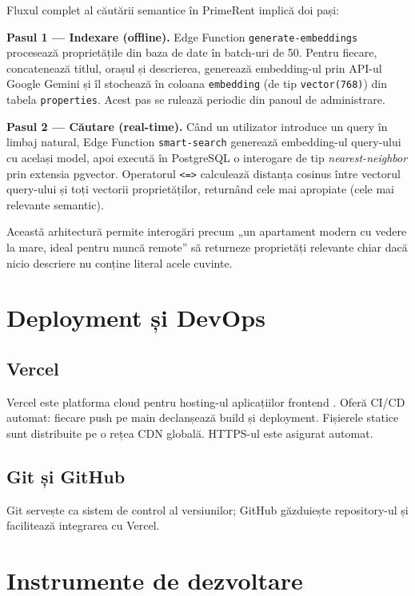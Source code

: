 \documentclass[12pt,a4paper,oneside]{report}
\begin{document}
Fluxul complet al căutării semantice în PrimeRent implică doi pași:

\textbf{Pasul 1 — Indexare (offline).} Edge Function \texttt{generate-embeddings} procesează proprietățile din baza de date în batch-uri de 50. Pentru fiecare, concatenează titlul, orașul și descrierea, generează embedding-ul prin API-ul Google Gemini și îl stochează în coloana \texttt{embedding} (de tip \texttt{vector(768)}) din tabela \texttt{properties}. Acest pas se rulează periodic din panoul de administrare.

\textbf{Pasul 2 — Căutare (real-time).} Când un utilizator introduce un query în limbaj natural, Edge Function \texttt{smart-search} generează embedding-ul query-ului cu același model, apoi execută în PostgreSQL o interogare de tip \textit{nearest-neighbor} prin extensia pgvector. Operatorul \texttt{<=>} calculează distanța cosinus între vectorul query-ului și toți vectorii proprietăților, returnând cele mai apropiate (cele mai relevante semantic).

Această arhitectură permite interogări precum „un apartament modern cu vedere la mare, ideal pentru muncă remote'' să returneze proprietăți relevante chiar dacă nicio descriere nu conține literal acele cuvinte.


\section{Deployment și DevOps}

\subsection{Vercel}

Vercel este platforma cloud pentru hosting-ul aplicațiilor frontend \cite{vercel}. Oferă CI/CD automat: fiecare push pe main declanșează build și deployment. Fișierele statice sunt distribuite pe o rețea CDN globală. HTTPS-ul este asigurat automat.

\subsection{Git și GitHub}

Git servește ca sistem de control al versiunilor; GitHub găzduiește repository-ul și facilitează integrarea cu Vercel.


\section{Instrumente de dezvoltare}
\end{document}
